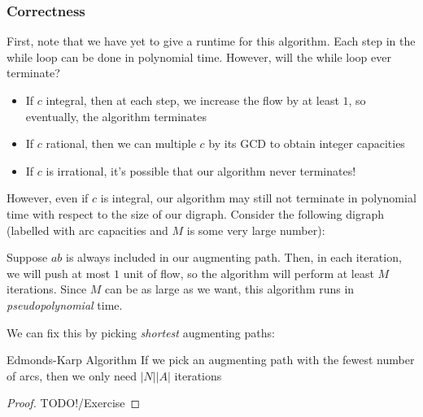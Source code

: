 \subsubsection{Correctness}
First, note that we have yet to give a runtime for this algorithm.
Each step in the while loop can be done in polynomial time.
However, will the while loop ever terminate?
\begin{itemize}
    \item If $c$ integral, then at each step, we increase the flow by at least $1$, so eventually, the algorithm terminates
    \item If $c$ rational, then we can multiple $c$ by its GCD to obtain integer capacities
    \item If $c$ is irrational, it's possible that our algorithm never terminates!
\end{itemize}

However, even if $c$ is integral, our algorithm may still not terminate in polynomial time with respect to the size of our digraph.
Consider the following digraph (labelled with arc capacities and $M$ is some very large number):

\begin{minipage}{\textwidth}
    \centering
\end{minipage}

Suppose $ab$ is always included in our augmenting path.
Then, in each iteration, we will push at most $1$ unit of flow, so the algorithm will perform at least $M$ iterations. 
Since $M$ can be as large as we want, this algorithm runs in \textit{pseudopolynomial} time.

We can fix this by picking \textit{shortest} augmenting paths:
\begin{proposition}{Edmonds-Karp Algorithm}{}
    If we pick an augmenting path with the fewest number of arcs, then we only need $|N||A|$ iterations
\end{proposition}
\begin{proof}
    TODO!/Exercise
\end{proof}

